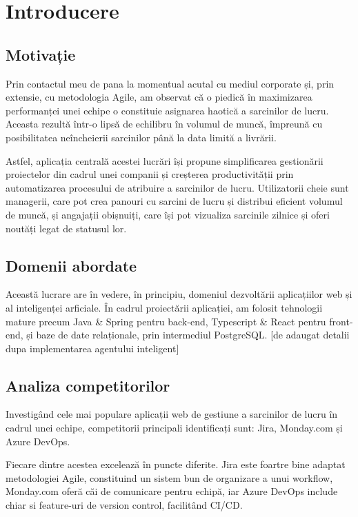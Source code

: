 \chapter{Introducere}

\section{Motivație}

Prin contactul meu de pana la momentual acutal cu mediul corporate și, prin extensie, cu metodologia Agile, am observat că o piedică în maximizarea performanței unei echipe o constituie asignarea haotică a sarcinilor de lucru. Aceasta rezultă într-o lipsă de echilibru în volumul de muncă, împreună cu posibilitatea neîncheierii sarcinilor până la data limită a livrării.

Astfel, aplicația centrală acestei lucrări își propune simplificarea gestionării proiectelor din cadrul unei companii și creșterea productivității prin automatizarea procesului de atribuire a sarcinilor de lucru. Utilizatorii cheie sunt managerii, care pot crea panouri cu sarcini de lucru și distribui eficient volumul de muncă, și angajații obișnuiți, care își pot vizualiza sarcinile zilnice și oferi noutăți legat de statusul lor.

\section{Domenii abordate}

Această lucrare are în vedere, în principiu, domeniul dezvoltării aplicațiilor web și al inteligenței arficiale. În cadrul proiectării aplicației, am folosit tehnologii mature precum Java \& Spring pentru back-end, Typescript \& React pentru front-end, și baze de date relaționale, prin intermediul PostgreSQL. [de adaugat detalii dupa implementarea agentului inteligent]

\section{Analiza competitorilor}

Investigând cele mai populare aplicații web de gestiune a sarcinilor de lucru în cadrul unei echipe, competitorii principali identificați sunt: Jira, Monday.com și Azure DevOps.

Fiecare dintre acestea excelează în puncte diferite. Jira este foartre bine adaptat metodologiei Agile, constituind un sistem bun de organizare a unui workflow, Monday.com oferă căi de comunicare pentru echipă, iar Azure DevOps include chiar si feature-uri de version control, facilitând CI/CD. 


